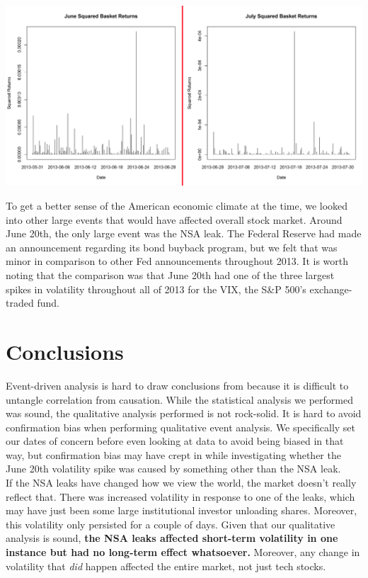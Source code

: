 \documentclass[11pt]{amsart}
\begin{document}
\centerline{\includegraphics[scale=0.7]{june+july_squared_ret.pdf}}

To get a better sense of the American economic climate at the time, we looked into other large events that would have affected overall stock market. Around June 20th, the only large event was the NSA leak. The Federal Reserve had made an announcement regarding its bond buyback program, but we felt that was minor in comparison to other Fed announcements throughout 2013. It is worth noting that the comparison was that June 20th had one of the three largest spikes in volatility throughout all of 2013 for the VIX, the S\&P 500's exchange-traded fund.

\section{Conclusions}
Event-driven analysis is hard to draw conclusions from because it is difficult to untangle correlation from causation. While the statistical analysis we performed was sound, the qualitative analysis performed is not rock-solid. It is hard to avoid confirmation bias when performing qualitative event analysis. We specifically set our dates of concern before even looking at data to avoid being biased in that way, but confirmation bias may have crept in while investigating whether the June 20th volatility spike was caused by something other than the NSA leak. \\

If the NSA leaks have changed how we view the world, the market doesn't really reflect that. There was increased volatility in response to one of the leaks, which may have just been some large institutional investor unloading shares. Moreover, this volatility only persisted for a couple of days. Given that our qualitative analysis is sound, \textbf{the NSA leaks affected short-term volatility in one instance but had no long-term effect whatsoever.} Moreover, any change in volatility that \textit{did} happen affected the entire market, not just tech stocks. \\
\end{document}
